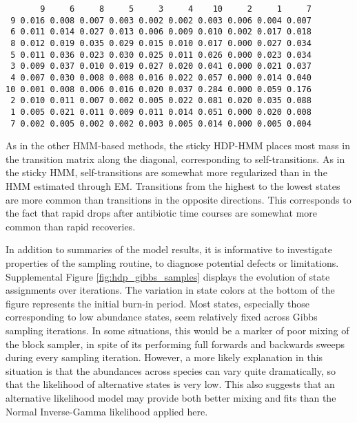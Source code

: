 \begin{verbatim}
       9     6     8     5     3     4    10     2     1     7
 9 0.016 0.008 0.007 0.003 0.002 0.002 0.003 0.006 0.004 0.007
 6 0.011 0.014 0.027 0.013 0.006 0.009 0.010 0.002 0.017 0.018
 8 0.012 0.019 0.035 0.029 0.015 0.010 0.017 0.000 0.027 0.034
 5 0.011 0.036 0.023 0.030 0.025 0.011 0.026 0.000 0.023 0.034
 3 0.009 0.037 0.010 0.019 0.027 0.020 0.041 0.000 0.021 0.037
 4 0.007 0.030 0.008 0.008 0.016 0.022 0.057 0.000 0.014 0.040
10 0.001 0.008 0.006 0.016 0.020 0.037 0.284 0.000 0.059 0.176
 2 0.010 0.011 0.007 0.002 0.005 0.022 0.081 0.020 0.035 0.088
 1 0.005 0.021 0.011 0.009 0.011 0.014 0.051 0.000 0.020 0.008
 7 0.002 0.005 0.002 0.002 0.003 0.005 0.014 0.000 0.005 0.004
\end{verbatim}

As in the other HMM-based methods, the sticky HDP-HMM places most mass in the
transition matrix along the diagonal, corresponding to self-transitions. As in
the sticky HMM, self-transitions are somewhat more regularized than in the HMM
estimated through EM. Transitions from the highest to the lowest states are more
common than transitions in the opposite directions. This corresponds to the fact
that rapid drops after antibiotic time courses are somewhat more common than
rapid recoveries.

In addition to summaries of the model results, it is informative to investigate
properties of the sampling routine, to diagnose potential defects or
limitations. Supplemental Figure \ref{fig:hdp_gibbs_samples} displays the
evolution of state assignments over iterations. The variation in state colors at
the bottom of the figure represents the initial burn-in period. Most states,
especially those corresponding to low abundance states, seem relatively fixed
across Gibbs sampling iterations. In some situations, this would be a marker of
poor mixing of the block sampler, in spite of its performing full forwards and
backwards sweeps during every sampling iteration. However, a more likely
explanation in this situation is that the abundances across species can vary
quite dramatically, so that the likelihood of alternative states is very low.
This also suggests that an alternative likelihood model may provide both better
mixing and fits than the Normal Inverse-Gamma likelihood applied here.


